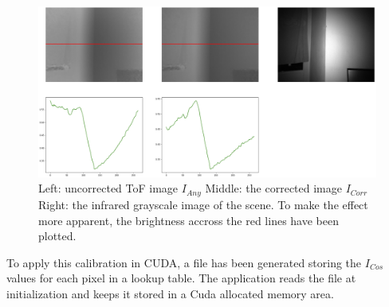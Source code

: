 \begin{figure}[H]
    \centering
    \includegraphics[width=1.0\textwidth]{images/flattened_tof_example.png}
    \caption{Left: uncorrected ToF image $I_{Any}$ Middle: the corrected image $I_{Corr}$ Right: the infrared grayscale image of the scene. To make the effect more apparent, the brightness accross the red lines have been plotted.}
    \label{im:ToFCorrected}
\end{figure}
To apply this calibration in CUDA, a file has been generated storing the $I_{Cos}$ values for each pixel in a lookup table. The application reads the file at initialization and keeps it stored in a Cuda allocated memory area. 

